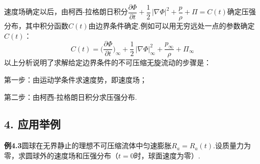 速度场确定以后，由柯西-拉格朗日积分$\dfrac{\partial\Phi}{\partial t}+\dfrac{1}{2}\,|\nabla\Phi|^{2}+\dfrac{p}{\rho}+\Pi=C(t)$确定压强分布，其中积分函数$C(t)$由边界条件确定.例如可以用无穷远处一点的参数确定$C(t)$：
\begin{equation*}
C(t)=\Big(\frac{\partial\Phi}{\partial t}\Big)_{\infty}+\frac{1}{2}\,\Big|\nabla\Phi\Big|_{\infty}^{2}+\frac{p_\infty}{\rho}+\Pi_\infty
\tag{4.34}
\end{equation*}
以上分析说明了求解给定边界条件的不可压缩无旋流动的步骤是：

第一步：由运动学条件求速度势，即速度场；

第二步：由柯西-拉格朗日积分求压强分布.

\subsection*{4. 应用举例}

\noindent\textbf{例4.3}\quad 圆球在无界静止的理想不可压缩流体中匀速膨胀$R_a=R_a(t)$.设质量力为零，求圆球外的速度场和压强分布（$t=0$时，球面速度为零）.

